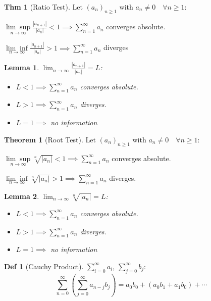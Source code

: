 \documentclass[a4paper, 10pt]{article}
\newtheorem*{lemma}{Lemma}
\theoremstyle{definition}
\newtheorem*{theorem}{Thm}
\newtheorem*{definition}{Def}
\theoremstyle{named}
\newtheorem*{ntheorem_wrapper}{Theorem}
\newenvironment{ntheorem}%
    {\begin{mdframed}[style=important]\begin{ntheorem_wrapper}}%
    {\end{ntheorem_wrapper}\end{mdframed}}
\begin{document}
\begin{theorem}[Ratio Test]
    Let $(a_n)_{n \geq 1}$ with $a_n \neq 0 \quad \forall n\geq 1$:
    
    $\underset{n\to\infty}{\lim\sup} \frac{|a_{n+1}|}{|a_n|} < 1 \implies \sum_{n=1}^\infty a_n$ converges absolute.

    $\underset{n\to\infty}{\lim\inf} \frac{|a_{n+1}|}{|a_n|} > 1 \implies \sum_{n=1}^\infty a_n$ diverges
\end{theorem}

\begin{lemma}
    $\lim_{n\to\infty} \frac{|a_{n+1}|}{|a_n|} = L$:

    \begin{itemize}
        \item $L < 1 \implies \sum_{n=1}^\infty a_n$ converges absolute.
        \item $L > 1 \implies \sum_{n=1}^\infty a_n$ diverges.
        \item $L = 1 \implies$ no information
    \end{itemize}
\end{lemma}

\begin{ntheorem}[Root Test]
    Let $(a_n)_{n \geq 1}$ with $a_n \neq 0 \quad \forall n\geq 1$:

    $\underset{n\to\infty}{\lim\sup} \sqrt[n]{|a_n|} < 1 \implies \sum_{n=1}^\infty a_n$ converges absolute.

    $\underset{n\to\infty}{\lim\inf} \sqrt[n]{|a_n|} > 1 \implies \sum_{n=1}^\infty a_n$ diverges.
\end{ntheorem}

\begin{lemma}
    $\lim_{n\to\infty} \sqrt[n]{|a_n|} = L$:

    \begin{itemize}
        \item $L < 1 \implies \sum_{n=1}^\infty a_n$ converges absolute.
        \item $L > 1 \implies \sum_{n=1}^\infty a_n$ diverges.
        \item $L = 1 \implies$ no information
    \end{itemize}
\end{lemma}

\begin{definition}[Cauchy Product]
    $\sum_{i=0}^\infty a_i$, $\sum_{j=0}^\infty b_j$:
    $$\sum_{n=0}^\infty (\sum_{j=0}^\infty a_{n-j}b_j) = a_0b_0 + (a_0b_1 + a_1b_0) + \cdots$$
\end{definition}
\end{document}
